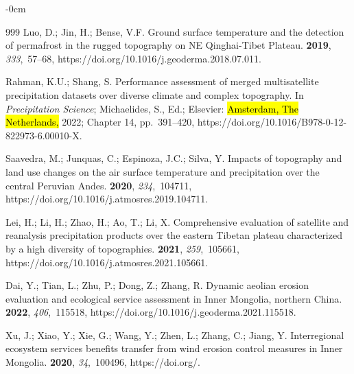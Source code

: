 \documentclass[geosciences,article,accept,pdftex,oneauthor]{Definitions/mdpi}
\begin{document}
\begin{adjustwidth}{-\extralength}{0cm}
\begin{thebibliography}{999}
Luo, D.; Jin, H.; Bense, V.F.
\newblock Ground surface temperature and the detection of permafrost in the
  rugged topography on NE Qinghai-Tibet Plateau.
 {\bf 2019}, {\em 333},~57--68, https://doi.org/10.1016/j.geoderma.2018.07.011.

Rahman, K.U.; Shang, S.
\newblock  Performance assessment of merged multisatellite
  precipitation datasets over diverse climate and complex topography. In {\em
  Precipitation Science}; Michaelides, S., Ed.; Elsevier:  \hl{Amsterdam, The Netherlands,} %
  2022; Chapter 14, pp.~391--420, https://doi.org/10.1016/B978-0-12-822973-6.00010-X.

Saavedra, M.; Junquas, C.; Espinoza, J.C.; Silva, Y.
\newblock Impacts of topography and land use changes on the air surface
  temperature and precipitation over the central Peruvian Andes.
 {\bf 2020}, {\em 234},~104711, https://doi.org/10.1016/j.atmosres.2019.104711.

Lei, H.; Li, H.; Zhao, H.; Ao, T.; Li, X.
\newblock Comprehensive evaluation of satellite and reanalysis precipitation
  products over the eastern Tibetan plateau characterized by a high diversity
  of topographies.
 {\bf 2021}, {\em 259},~105661, https://doi.org/10.1016/j.atmosres.2021.105661.

Dai, Y.; Tian, L.; Zhu, P.; Dong, Z.; Zhang, R.
\newblock Dynamic aeolian erosion evaluation and ecological service assessment
  in Inner Mongolia, northern China.
 {\bf 2022}, {\em 406},~115518, https://doi.org/10.1016/j.geoderma.2021.115518.

Xu, J.; Xiao, Y.; Xie, G.; Wang, Y.; Zhen, L.; Zhang, C.; Jiang, Y.
\newblock Interregional ecosystem services benefits transfer from wind erosion
  control measures in Inner Mongolia.
 {\bf 2020}, {\em 34},~100496,
  https://doi.org/{\href{https://doi.org/10.1016/j.envdev.2020.100496}{}}.


\end{thebibliography}
\end{adjustwidth}
\end{document}
